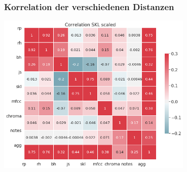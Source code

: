\documentclass[12pt]{FSUBeamer_official}
\begin{document}
\begin{frame}
	\frametitle{Korrelation der verschiedenen Distanzen}
	\begin{minipage}[b]{0.85\linewidth}
		\centering
		\includegraphics[width=0.7\textwidth]{pics/SparkFeat/skl_corr_scaled.png}	
	\end{minipage}
\end{frame}
\end{document}
